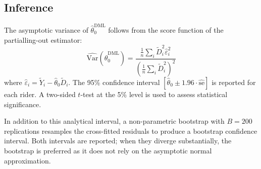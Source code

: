 \subsection{Inference}

The asymptotic variance of $\hat{\theta}_0^{\text{DML}}$ follows from the score function of the partialling-out estimator:
\begin{equation}
    \widehat{\text{Var}}(\hat{\theta}_0^{\text{DML}}) = \frac{\frac{1}{n}\sum_i \tilde{D}_i^2 \hat{\varepsilon}_i^2}{\left(\frac{1}{n}\sum_i \tilde{D}_i^2\right)^2}
\end{equation}
where $\hat{\varepsilon}_i = \tilde{Y}_i - \hat{\theta}_0 \tilde{D}_i$. The 95\% confidence interval $[\hat{\theta}_0 \pm 1.96 \cdot \widehat{\text{se}}]$ is reported for each rider. A two-sided $t$-test at the 5\% level is used to assess statistical significance.

In addition to this analytical interval, a non-parametric bootstrap with $B = 200$ replications resamples the cross-fitted residuals to produce a bootstrap confidence interval. Both intervals are reported; when they diverge substantially, the bootstrap is preferred as it does not rely on the asymptotic normal approximation.
